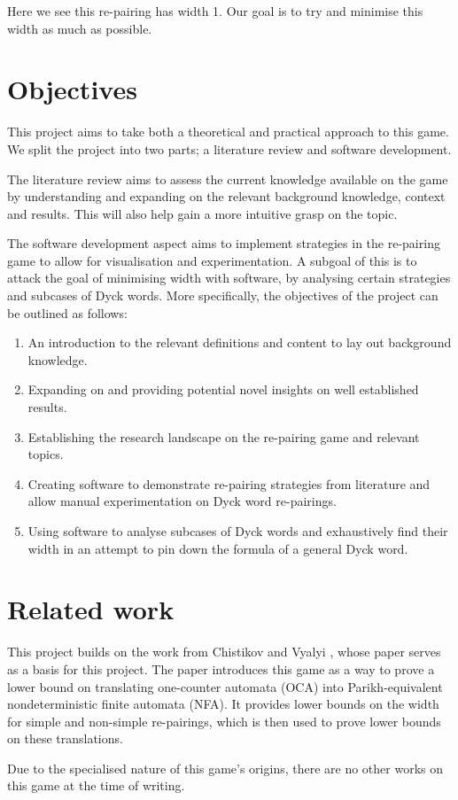 Here we see this re-pairing has width 1. Our goal is to try and minimise this width as much as possible. 


\section{Objectives}

This project aims to take both a theoretical and practical approach to this game. We split the project into two parts; a literature review and software development.

The literature review aims to assess the current knowledge available on the game by understanding and expanding on the relevant background knowledge, context and results. This will also help gain a more intuitive grasp on the topic. 

The software development aspect aims to implement strategies in the re-pairing game to allow for visualisation and experimentation. A subgoal of this is to attack the goal of minimising width with software, by analysing certain strategies and subcases of Dyck words. More specifically, the objectives of the project can be outlined as follows:

\begin{enumerate}
    \item An introduction to the relevant definitions and content to lay out background knowledge.
    \item Expanding on and providing potential novel insights on well established results.
    \item Establishing the research landscape on the re-pairing game and relevant topics.
    \item Creating software to demonstrate re-pairing strategies from literature and allow manual experimentation on Dyck word re-pairings.
    \item Using software to analyse subcases of Dyck words and exhaustively find their width in an attempt to pin down the formula of a general Dyck word.
\end{enumerate}

\section{Related work}
This project builds on the work from Chistikov and Vyalyi \cite{chistikov2020re}, whose paper serves as a basis for this project. The paper introduces this game as a way to prove a lower bound on translating one-counter automata (OCA) into Parikh-equivalent nondeterministic finite automata (NFA). It provides lower bounds on the width for simple and non-simple re-pairings, which is then used to prove lower bounds on these translations.

Due to the specialised nature of this game's origins, there are no other works on this game at the time of writing.